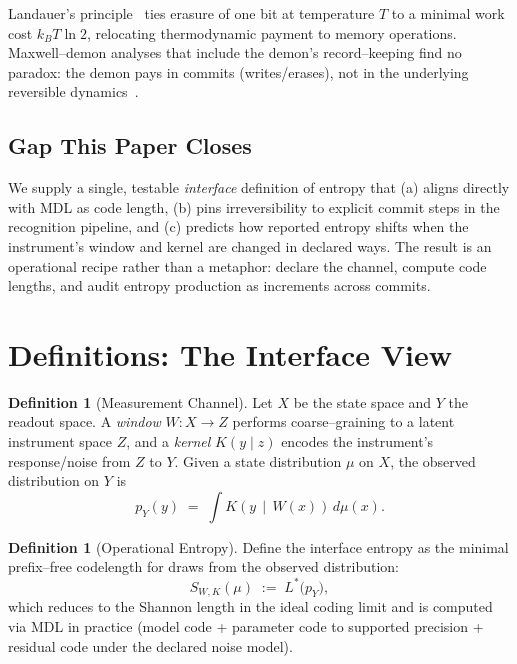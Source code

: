 \documentclass[11pt,letterpaper]{article}
\theoremstyle{definition}
\newtheorem{definition}[theorem]{Definition}
\theoremstyle{remark}
\begin{document}
Landauer's principle~\cite{Landauer1961} ties erasure of one bit at temperature \(T\) to a minimal work cost \(k_B T\ln 2\), relocating thermodynamic payment to memory operations. Maxwell--demon analyses that include the demon's record--keeping find no paradox: the demon pays in commits (writes/erases), not in the underlying reversible dynamics~\cite{Bennett1982}.

\subsection{Gap This Paper Closes}

We supply a single, testable \emph{interface} definition of entropy that (a) aligns directly with MDL as code length, (b) pins irreversibility to explicit commit steps in the recognition pipeline, and (c) predicts how reported entropy shifts when the instrument's window and kernel are changed in declared ways. The result is an operational recipe rather than a metaphor: declare the channel, compute code lengths, and audit entropy production as increments across commits.

\section{Definitions: The Interface View}

\begin{definition}[Measurement Channel]
Let \(X\) be the state space and \(Y\) the readout space. A \emph{window} \(W\!:\!X\!\to\!Z\) performs coarse--graining to a latent instrument space \(Z\), and a \emph{kernel} \(K(y\mid z)\) encodes the instrument's response/noise from \(Z\) to \(Y\). Given a state distribution \(\mu\) on \(X\), the observed distribution on \(Y\) is
\begin{equation}\label{eq:channel}
p_Y(y) \;=\; \int K\!\left(y \,\middle|\, W(x)\right)\, d\mu(x).
\end{equation}
\end{definition}

\begin{definition}[Operational Entropy]
Define the interface entropy as the minimal prefix--free codelength for draws from the observed distribution:
\begin{equation}\label{eq:entropy}
S_{W,K}(\mu) \;:=\; L^\ast\!\big(p_Y\big),
\end{equation}
which reduces to the Shannon length in the ideal coding limit and is computed via MDL in practice (model code + parameter code to supported precision + residual code under the declared noise model).
\end{definition}
\end{document}
